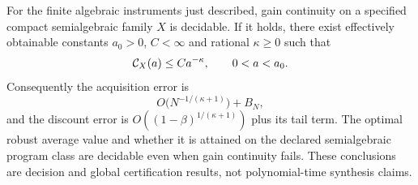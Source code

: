 \begin{theorem}\label{thm:algebraic}
For the finite algebraic instruments just described, gain continuity on a specified compact semialgebraic family $X$ is decidable. If it holds, there exist effectively obtainable constants $a_0>0$, $C<\infty$ and rational $\kappa\ge0$ such that
\begin{equation}\label{eq:algebraic-price}
 \mathcal C_X(a)\le C a^{-\kappa},\qquad 0<a<a_0.
\end{equation}
Consequently the acquisition error is
\begin{equation}\label{eq:algebraic-rate}
 O\bigl(N^{-1/(\kappa+1)}\bigr)+B_N,
\end{equation}
and the discount error is $O((1-\beta)^{1/(\kappa+1)})$ plus its tail term. The optimal robust average value and whether it is attained on the declared semialgebraic program class are decidable even when gain continuity fails. These conclusions are decision and global certification results, not polynomial-time synthesis claims.
\end{theorem}
